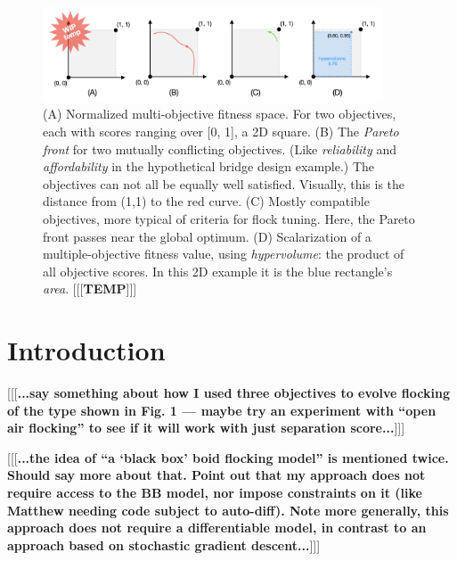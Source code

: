 \documentclass[letterpaper]{article}
\begin{document}


\begin{figure}[t]
    \centering
    \includegraphics[width=0.9\textwidth]{images/temp_MOF_HV.png}
    \caption{(A) Normalized multi-objective fitness space. For two objectives, each with scores ranging over [0, 1], a 2D square. (B) The \textit{Pareto front} for two mutually conflicting objectives. (Like \textit{reliability} and \textit{affordability} in the hypothetical bridge design example.) The objectives can not all be equally well satisfied. Visually, this is the distance from (1,1) to the red curve. (C) Mostly compatible objectives, more typical of criteria for flock tuning. Here, the Pareto front passes near the global optimum. (D) Scalarization of a multiple-objective fitness value, using \textit{hypervolume}: the product of all objective scores. In this 2D example it is the blue rectangle's \textit{area}. [[[\textbf{TEMP}]]]}
    \label{fig:MOF_HV}
\end{figure}


\section{Introduction}
\label{sec:intro}

[[[\textbf{...say something about how I used three objectives to evolve flocking of the type shown in Fig. 1 --- maybe try an experiment with ``open air flocking'' to see if it will work with just separation score...}]]]

[[[\textbf{...the idea of ``a `black box' boid flocking model'' is mentioned twice. Should say more about that. Point out that my approach does not require access to the BB model, nor impose constraints on it (like Matthew needing code subject to auto-diff). Note more generally, this approach does not require a differentiable model, in contrast to an approach based on stochastic gradient descent...}]]]
\end{document}
